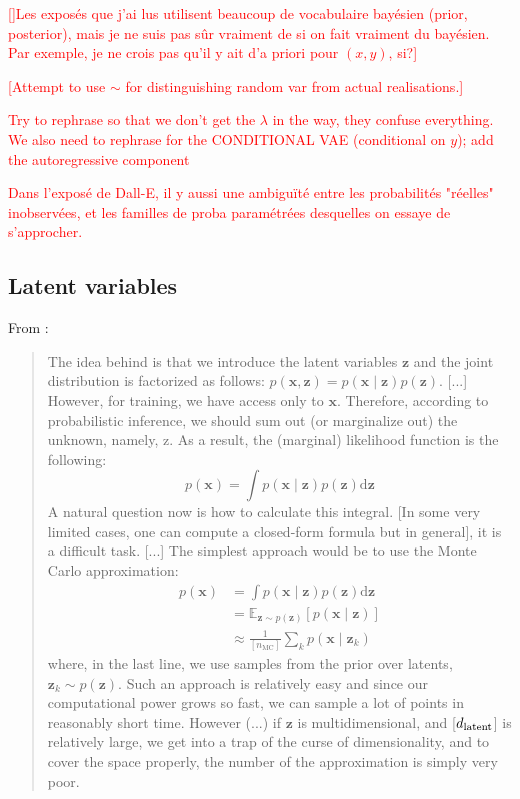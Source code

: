 \documentclass{article}
\begin{document}
\begin{appendix}
\textcolor{red}{[]Les exposés que j'ai lus utilisent beaucoup de vocabulaire bayésien (prior, posterior), mais je ne suis pas sûr vraiment de si on fait vraiment du bayésien. Par exemple, je ne crois pas qu'il y ait d'a priori pour $(x,y)$, si?]}

\textcolor{red}{[Attempt to use $\sim$ for distinguishing random var from actual realisations.]} 


\textcolor{red}{Try to rephrase so that we don't get the $\lambda$ in the way, they confuse everything. We also need to rephrase for the CONDITIONAL VAE (conditional on $y$); add the autoregressive component}

\textcolor{red}{Dans l'exposé de Dall-E, il y aussi une ambiguïté entre les probabilités "réelles" inobservées, et les familles de proba paramétrées desquelles on essaye de s'approcher.}

\subsection{Latent variables}

From \cite{deepgen}:

\blockquote{

The idea behind  is that we introduce the latent variables $\mathbf{z}$ and the joint distribution is factorized as follows: $p(\mathbf{x}, \mathbf{z})=p(\mathbf{x} \mid \mathbf{z}) p(\mathbf{z})$.
[...]
However, for training, we have access only to $\mathbf{x}$.
Therefore, according to probabilistic inference, we should sum out (or marginalize out) the unknown, namely, z.
As a result, the (marginal) likelihood function is the following:
$$
p(\mathbf{x})=\int p(\mathbf{x} \mid \mathbf{z}) p(\mathbf{z}) \mathrm{d} \mathbf{z}
$$
A natural question now is how to calculate this integral. [In some very limited cases, one can compute a closed-form formula but in general], it is a difficult task. [...] The simplest approach would be to use the Monte Carlo approximation:
$$
\begin{aligned}
p(\mathbf{x}) &=\int p(\mathbf{x} \mid \mathbf{z}) p(\mathbf{z}) \mathrm{d} \mathbf{z} \\
&=\mathbb{E}_{\mathbf{z} \sim p(\mathbf{z})}[p(\mathbf{x} \mid \mathbf{z})] \\
& \approx \frac{1}{[n_\textrm{MC}]} \sum_{k} p\left(\mathbf{x} \mid \mathbf{z}_{k}\right)
\end{aligned}
$$
where, in the last line, we use samples from the prior over latents, $\mathbf{z}_{k} \sim p(\mathbf{z})$. Such an approach is relatively easy and since our computational power grows so fast, we can sample a lot of points in reasonably short time. However (...) if $\mathbf{z}$ is multidimensional, and [${d_{\mathrm{latent}}}$] is relatively large, we get into a trap of the curse of dimensionality, and to cover the space properly, the number of the approximation is simply very poor.

}
\end{appendix}
\end{document}
